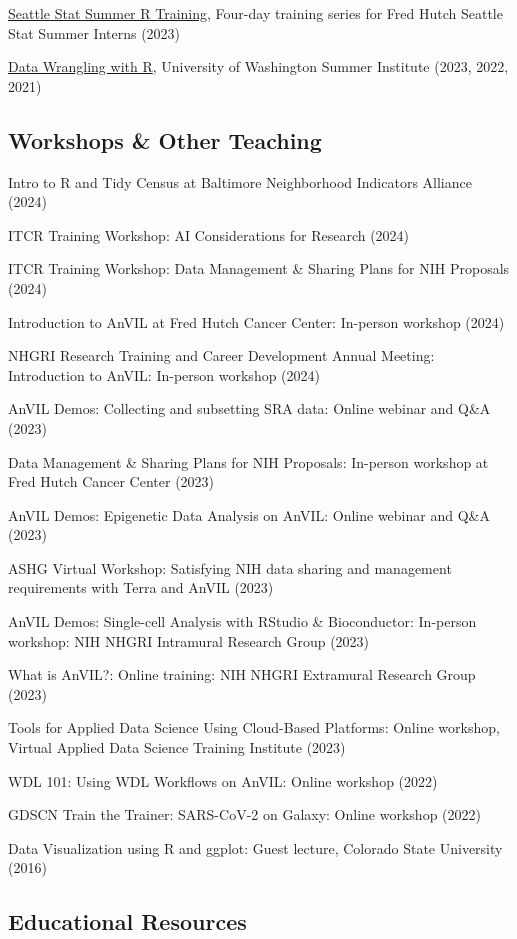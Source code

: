 \documentclass{cv}
\begin{document}
\href{https://hutchdatascience.org/SeattleStatSummer_R}{Seattle Stat Summer R Training}, Four-day training series for Fred Hutch Seattle Stat Summer Interns (2023)

\href{http://sisbid.github.io/Data-Wrangling/}{Data Wrangling with R}, University of Washington Summer Institute (2023, 2022, 2021)

\subsection*{Workshops \& Other Teaching}

Intro to R and Tidy Census at Baltimore Neighborhood Indicators Alliance (2024)

ITCR Training Workshop: AI Considerations for Research (2024)

ITCR Training Workshop: Data Management \& Sharing Plans for NIH Proposals (2024)

Introduction to AnVIL at Fred Hutch Cancer Center: In-person workshop (2024)

NHGRI Research Training and Career Development Annual Meeting: Introduction to AnVIL: In-person workshop (2024)

AnVIL Demos: Collecting and subsetting SRA data: Online webinar and Q\&A (2023)

Data Management \& Sharing Plans for NIH Proposals: In-person workshop at Fred Hutch Cancer Center (2023)

AnVIL Demos: Epigenetic Data Analysis on AnVIL: Online webinar and Q\&A (2023)

ASHG Virtual Workshop: Satisfying NIH data sharing and management requirements with Terra and AnVIL (2023)

AnVIL Demos: Single-cell Analysis with RStudio \& Bioconductor: In-person workshop: NIH NHGRI Intramural Research Group (2023)

What is AnVIL?: Online training: NIH NHGRI Extramural Research Group (2023)

Tools for Applied Data Science Using Cloud-Based Platforms: Online workshop, Virtual Applied Data Science Training Institute (2023)

WDL 101: Using WDL Workflows on AnVIL: Online workshop (2022)

GDSCN Train the Trainer: SARS-CoV-2 on Galaxy: Online workshop (2022)

Data Visualization using R and ggplot: Guest lecture, Colorado State University (2016)

\subsection*{Educational Resources}
\end{document}
